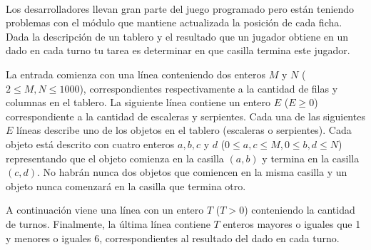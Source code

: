 \documentclass{oci}
\begin{document}
\begin{problemDescription}
  \begin{center}
    ~
  \end{center}

  Los desarrolladores llevan gran parte del juego programado pero están teniendo
  problemas con el módulo que mantiene actualizada la posición de cada ficha.
  Dada la descripción de un tablero y el resultado que un jugador obtiene en un
  dado en cada turno tu tarea es determinar en que casilla termina este jugador.
\end{problemDescription}

\begin{inputDescription}
  La entrada comienza con una línea conteniendo dos enteros $M$ y $N$ ($2 \leq
  M, N \leq 1000$), correspondientes respectivamente a la cantidad de filas y
  columnas en el tablero.
  La siguiente línea contiene un entero $E$ ($E \geq 0$) correspondiente a la
  cantidad de escaleras y serpientes.
  Cada una de las siguientes $E$ líneas describe uno de los objetos en el
  tablero (escaleras o serpientes).
  Cada objeto está descrito con cuatro enteros $a, b, c$ y $d$ ($0 \leq a, c
  \leq M, 0 \leq b, d \leq N$)
  representando que el objeto comienza en la casilla $(a, b)$ y termina en la
  casilla $(c, d)$.
  No habrán nunca dos objetos que comiencen en la misma casilla y un objeto
  nunca comenzará en la casilla que termina otro.

  A continuación viene una línea con un entero $T$ ($T > 0$) conteniendo la
  cantidad de turnos.
  Finalmente, la última línea contiene $T$ enteros mayores o iguales que 1 y
  menores o iguales 6, correspondientes al resultado del dado en cada turno.
\end{inputDescription}
\end{document}
